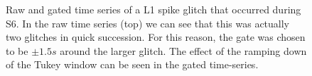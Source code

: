 \begin{figure}[p]
\center
{}
\caption{Raw and gated time series of a L1 spike glitch that occurred during \ac{S6}. In the raw time series (top) we can see that this was actually two glitches in quick succession. For this reason, the gate was chosen to be $\pm1.5s$ around the larger glitch. The effect of the ramping down of the Tukey window can be seen in the gated time-series.}
\label{fig:gating-time_series}
\end{figure}

